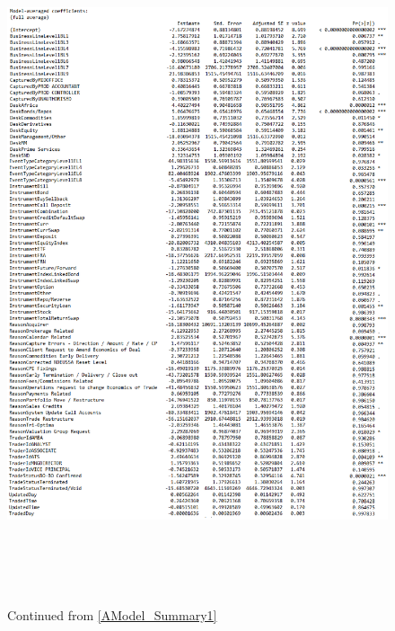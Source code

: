 \documentclass{DissertateUSU}
\begin{document}
\begin{figure}
\centering
\includegraphics[height=20cm, width=15cm]{Get_models_bin2.eps}
\caption[Model averaging]{Continued from \ref{AModel_Summary1}}
\label{AModel_Summary2}
\end{figure}
\end{document}
